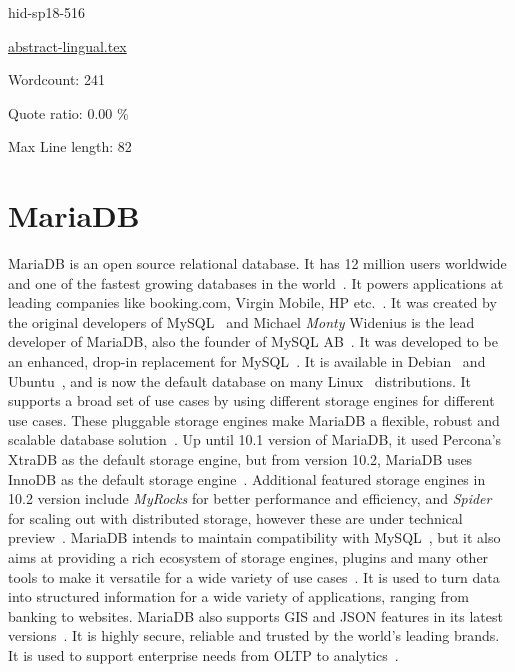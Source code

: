 \begin{IU}

hid-sp18-516

\href{https://github.com/cloudmesh-community/hid-sp18-516/blob/master//technology/abstract-lingual.tex}{abstract-lingual.tex}

 

Wordcount: 241


Quote ratio: 0.00 \%
 
Max Line length: 82
\end{IU}

\section{MariaDB}


MariaDB is an open source relational database. It has 12 million users worldwide 
and one of the fastest growing databases in the 
world~\cite{hid-sp18-516-www-mariadb}. It powers applications at leading 
companies like booking.com, Virgin Mobile, HP 
etc.~\cite{hid-sp18-516-www-mariadb}. It was created by the original developers
of MySQL~\cite{hid-sp18-516-www-wiki-mysql} and Michael \textit{Monty} Widenius 
is the lead developer of MariaDB, also the founder of MySQL 
AB~\cite{hid-sp18-516-www-wiki-mariadb}. It was developed to be an enhanced, 
drop-in replacement for MySQL~\cite{hid-sp18-516-www-mariadb-foundation}. It is 
available in Debian~\cite{hid-sp18-516-www-debian-org} and 
Ubuntu~\cite{hid-sp18-516-www-wiki-ubuntu}, and is now the default database on 
many Linux~\cite{hid-sp18-516-www-wiki-linux} distributions. It supports a broad 
set of use cases by using different storage engines for different use cases. These 
pluggable storage engines make MariaDB a flexible, robust and scalable database 
solution~\cite{hid-sp18-516-www-mariadb-server}. Up until 10.1 version of MariaDB, 
it used Percona's XtraDB as the default storage engine, but from version 10.2, 
MariaDB uses InnoDB as the default storage 
engine~\cite{hid-sp18-516-www-wiki-xtradb}. Additional featured storage engines
in 10.2 version include \textit{MyRocks} for better performance and efficiency,
and \textit{Spider} for scaling out with distributed storage, however these are
under technical preview~\cite{hid-sp18-516-www-mariadb-server}. MariaDB intends
to maintain compatibility with MySQL~\cite{hid-sp18-516-www-wiki-mariadb}, but
it also aims at providing a rich ecosystem of storage engines, plugins and many
other tools to make it versatile for a wide variety of use
cases~\cite{hid-sp18-516-www-mariadb-foundation}. It is used to turn data into
structured information for a wide variety of applications, ranging from banking
to websites. MariaDB also supports GIS and JSON features in its latest
versions~\cite{hid-sp18-516-www-mariadb-foundation}. It is highly secure,
reliable and trusted by the world's leading brands. It is used to support
enterprise needs from OLTP to analytics~\cite{hid-sp18-516-www-mariadb}.


